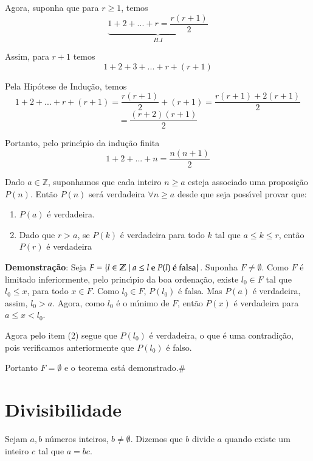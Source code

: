 Agora, suponha que para $r\geq 1$, temos \[\underbrace{1+2+...+r=\displaystyle\frac{r(r+1)}{2}}_{H.I}\]

Assim, para $r+1$ temos \[1+2+3+...+r+(r+1)\]

Pela Hip{\'o}tese de Indu{\c c}{\~a}o, temos \[1+2+...+r+(r+1)=\displaystyle\frac{r(r+1)}{2}+(r+1)=\displaystyle\frac{r(r+1)+2(r+1)}{2}\] \[=\displaystyle\frac{(r+2)(r+1)}{2}\]

Portanto, pelo princ{\'\i}pio da indu{\c c}{\~a}o finita \[1+2+...+n=\displaystyle\frac{n(n+1)}{2}\]

\begin{teorema}
Dado $a\in\mathbb{Z}$, suponhamos que cada inteiro $n\geq a$ esteja associado uma proposi{\c c}{\~a}o $P(n)$. Ent{\~a}o $P(n)$ ser{\'a} verdadeira $\forall n\geq a$ desde que seja poss{\'\i}vel provar que:
\begin{enumerate}
\item $P(a)$ {\'e} verdadeira.
\item Dado que $r > a$, se $P(k)$ {\'e} verdadeira para todo $k$ tal que $a \leq k \leq r$, ent{\~a}o $P(r)$ {\'e} verdadeira
\end{enumerate}
\end{teorema}

\textbf{Demonstra{\c c}{\~a}o}:
Seja $F=\{l \in \Z \mid a \leq l\ \mbox{e}\ P(l)\ \mbox{{\'e} falsa}\}$. Suponha $F \neq \emptyset$. Como $F$ {\'e} limitado inferiormente, pelo princ{\'\i}pio da boa ordena{\c c}{\~a}o, existe $l_0 \in F$ tal que $l_{0} \leq x$, para todo $x \in F$. Como $l_{0} \in F$, $P(l_0)$ {\'e} falsa. Mas $P(a)$ {\'e} verdadeira, assim, $l_0 > a$. Agora, como $l_0$ {\'e} o m{\'\i}nimo de $F$, ent{\~a}o $P(x)$ {\'e} verdadeira para $a \leq x < l_0$.

Agora pelo item (2) segue que $P(l_0)$ {\'e} verdadeira, o que {\'e} uma contradi{\c c}{\~a}o, pois verificamos anteriormente que $P(l_0)$ {\'e} falso.

Portanto $F=\emptyset$ e o teorema est{\'a} demonstrado.\#

\section{Divisibilidade}

\begin{definicao}[Divis{\~a}o] Sejam $a,b$ n{\'u}meros inteiros, $b\neq\emptyset$. Dizemos que $b$ divide $a$ quando existe um inteiro $c$ tal que $a=bc$.\end{definicao}

